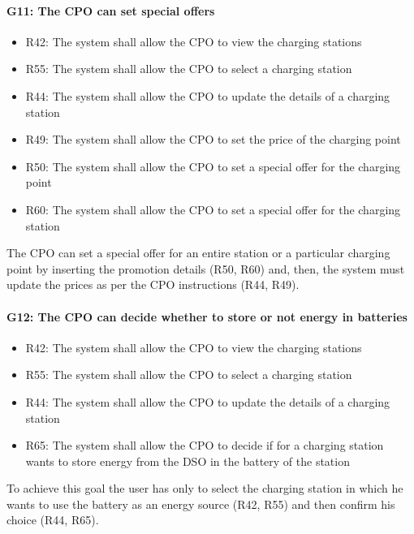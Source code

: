 \paragraph{G11: The CPO can set special offers}
\begin{itemize}
    \item R42: The system shall allow the CPO to view the charging stations
    \item R55: The system shall allow the CPO to select a charging station
    \item R44: The system shall allow the CPO to update the details of a charging station
    \item R49: The system shall allow the CPO to set the price of the charging point
    \item R50: The system shall allow the CPO to set a special offer for the charging point
    \item R60: The system shall allow the CPO to set a special offer for the charging station
\end{itemize}
The CPO can set a special offer for an entire station or a particular charging point by inserting the promotion details (R50, R60) and, then, the system must update the prices as per the CPO instructions (R44, R49).

\paragraph{G12: The CPO can decide whether to store or not energy in batteries}
\begin{itemize}
    \item R42: The system shall allow the CPO to view the charging stations
    \item R55: The system shall allow the CPO to select a charging station
    \item R44: The system shall allow the CPO to update the details of a charging station  
    \item R65: The system shall allow the CPO to decide if for a charging station wants to store energy from the DSO in the battery of the station
\end{itemize}
To achieve this goal the user has only to select the charging station in which he wants to use the battery as an energy source (R42, R55) and then confirm his choice (R44, R65).

